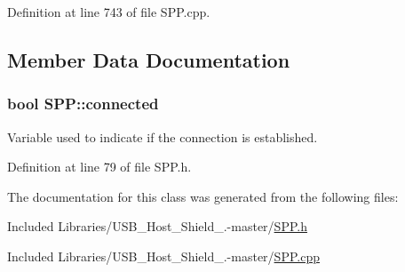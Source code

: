 \-Definition at line 743 of file \-S\-P\-P.\-cpp.



\subsection{\-Member \-Data \-Documentation}
\hypertarget{class_s_p_p_ade5d4f0ab50ddcad14f75fce4450a028}{
\subsubsection[{connected}]{\setlength{\rightskip}{0pt plus 5cm}bool {\bf \-S\-P\-P\-::connected}}}\label{class_s_p_p_ade5d4f0ab50ddcad14f75fce4450a028}
\-Variable used to indicate if the connection is established. 

\-Definition at line 79 of file \-S\-P\-P.\-h.



\-The documentation for this class was generated from the following files\-:\begin{DoxyCompactItemize}
\item 
\-Included Libraries/\-U\-S\-B\-\_\-\-Host\-\_\-\-Shield\-\_.-\/master/\hyperlink{_s_p_p_8h}{\-S\-P\-P.\-h}\item 
\-Included Libraries/\-U\-S\-B\-\_\-\-Host\-\_\-\-Shield\-\_.-\/master/\hyperlink{_s_p_p_8cpp}{\-S\-P\-P.\-cpp}\end{DoxyCompactItemize}
